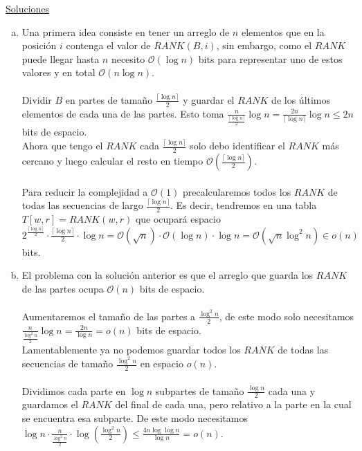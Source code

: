 \documentclass[dcc,uchile]{fcfmcourse}
\begin{document}
\newpage
\begin{center}
{\huge \underline{Soluciones}}
\end{center}
\begin{problems}
\item 
\begin{enumerate}[a)]
\item Una primera idea consiste en tener un arreglo de $n$ elementos que en la posición $i$ contenga el valor de $RANK(B,i)$, sin embargo, como el $RANK$ puede llegar hasta $n$ necesito $\mathcal{O}(\log n)$ bits para representar uno de estos valores y en total $\mathcal{O}(n\log n)$. \crying\\

\idea\\
Dividir $B$ en partes de tamaño $\frac{\lceil \log n \rceil}{2}$ y guardar el $RANK$ de los últimos elementos de cada una de las partes. Esto toma $\frac{n}{\frac{\lceil \log n \rceil}{2}}\log n = \frac{2n}{\lceil \log n \rceil}\log n \le 2n$ bits de espacio.\\
Ahora que tengo el $RANK$ cada $\frac{\lceil \log n \rceil}{2}$ solo debo identificar el $RANK$ más cercano y luego calcular el resto en tiempo $\mathcal{O}\left(\frac{\lceil \log n \rceil}{2}\right)$. \\
\idea\\
Para reducir la complejidad a $\mathcal{O}(1)$ precalcularemos todos los $RANK$ de todas las secuencias de largo $\frac{\lceil \log n \rceil}{2}$. Es decir, tendremos en una tabla $T[w,r] = RANK(w,r)$ que ocupará espacio $2^{\frac{\lceil \log n \rceil}{2}} \cdot \frac{\lceil \log n \rceil}{2} \cdot \log n = \mathcal{O}(\sqrt{n})\cdot \mathcal{O}(\log n) \cdot \log n = \mathcal{O}(\sqrt{n} \log^2 n) \in o(n)$ bits.\wedidit  
\item El problema con la solución anterior es que el arreglo que guarda los $RANK$ de las partes ocupa $\mathcal{O}(n)$ bits de espacio.\\
\idea\\
Aumentaremos el tamaño de las partes a $\frac{\log^2 n}{2}$, de este modo solo necesitamos $\frac{n}{\frac{\log^2 n }{2}}\log n = \frac{2n}{\log n } = o(n)$ bits de espacio.\\
Lamentablemente ya no podemos guardar todos los $RANK$ de todas las secuencias de tamaño $\frac{\log^2 n}{2}$ en espacio $o(n)$. \crying\\
\idea\\
Dividimos cada parte en $\log n$ subpartes de tamaño $\frac{\log n}{2}$ cada una y guardamos el $RANK$ del final de cada una, pero relativo a la parte en la cual se encuentra esa subparte. De este modo necesitamos $\log n \cdot \frac{n}{\frac{\log^2 n}{2}} \cdot \log \left(\frac{\log^2 n}{2}\right) \le \frac{4n\log \log n}{\log n} = o(n)$. \wedidit

\end{enumerate}
\end{problems}
\end{document}
